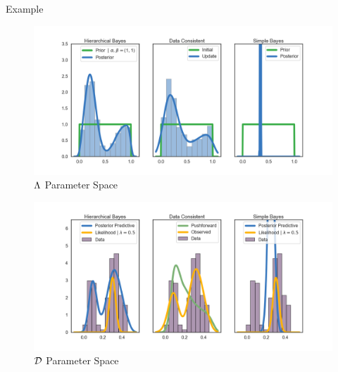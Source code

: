 \begin{block}{Example}
\begin{figure}
        \includegraphics[width=30cm]{figures/distr_EX_lambda_space.png}
        \vspace{-0.5cm}
        \caption{ $\Lambda$ Parameter Space }
\end{figure}
\begin{figure}
        \includegraphics[width=30cm]{figures/distr_EX_data_space.png}
        \vspace{-0.5cm}
        \centering
        \caption{$\mathcal{D}$ Parameter Space  }
\end{figure}


\end{block}





